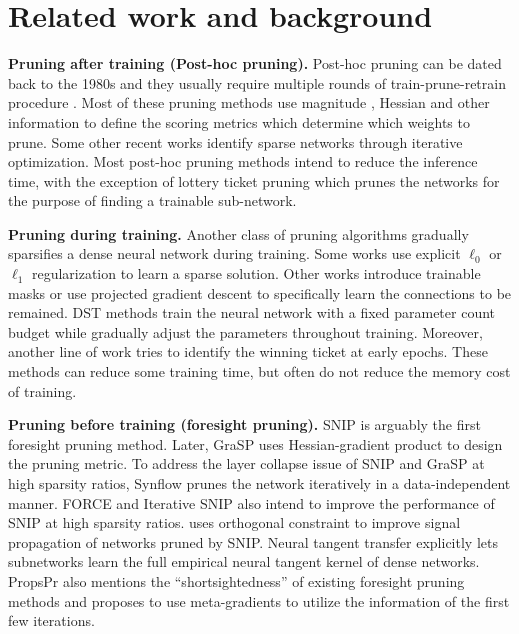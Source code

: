 \documentclass{article} %
\begin{document}
\section{Related work and background}

\textbf{Pruning after training (Post-hoc pruning).}  Post-hoc pruning can be dated back to the 1980s \citep{janowsky1989pruning, mozer1989using} and they usually require multiple rounds of train-prune-retrain procedure \citep{han2015,OBD}. Most of these pruning methods use magnitude \citep{han2015}, Hessian \citep{OBD, OBS, molchanov2019importance} and other information \citep{dai2018compressing, guo2016dynamic, dong2017learning, yu2018nisp} to define the scoring metrics which determine which weights to prune.  Some other recent works \citep{verma2021sparsifying} identify sparse networks through iterative optimization. Most post-hoc pruning methods intend to reduce the inference time, with the exception of lottery ticket pruning \citep{LTH, LTR} which prunes the networks for the purpose of finding a trainable sub-network. 

\textbf{Pruning during training.} Another class of pruning algorithms gradually sparsifies a dense neural network during training. Some works use explicit $\ell_0$ \citep{louizos2017learning} or $\ell_1$ \citep{wen2016learning} regularization to learn a sparse solution. Other works introduce trainable  masks \citep{liu2020dynamic, savarese2020winning, kang2020operation, kusupati2020soft, srinivas2017training, xiao2019autoprune} or use projected gradient descent \citep{zhou2021effective} to specifically learn the connections to be remained. DST methods \citep{mocanu2018scalable, bellec2017deep, mostafa2019parameter, dettmers2019sparse, liu2021selfish, evci2020rigging, liu2021we, liu2021sparse} train the neural network with a fixed parameter count budget while gradually adjust the parameters throughout training. Moreover, another line of work \citep{you2019drawing} tries to identify the winning ticket at early epochs. These methods can reduce some training time, but often do not reduce the memory cost of training. 

\textbf{Pruning before training (foresight pruning).} SNIP \citep{snip} is arguably the first foresight pruning method. Later, GraSP \citep{grasp} uses Hessian-gradient product to design the pruning metric. To address the layer collapse issue of SNIP and GraSP at high sparsity ratios, Synflow \citep{synflow} prunes the network iteratively in a data-independent manner. FORCE and Iterative SNIP \citep{de2020progressive} also intend to improve the performance of SNIP at high sparsity ratios. \citet{lee2019signal} uses orthogonal constraint to improve signal propagation of networks pruned by SNIP. Neural tangent transfer \citep{NTT} explicitly lets subnetworks learn the full empirical neural tangent kernel of dense networks. PropsPr \citep{alizadeh2022prospect} also mentions the ``shortsightedness'' of existing foresight pruning methods and proposes to use meta-gradients to utilize the information of the first few iterations. 
\end{document}
